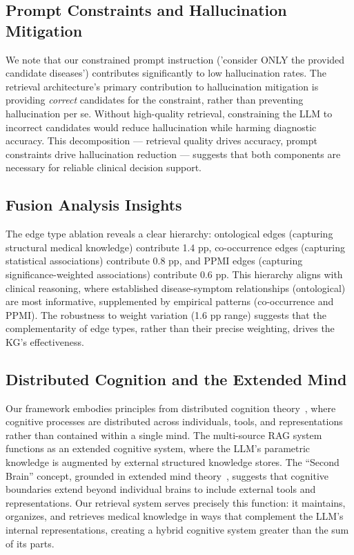 \documentclass[preprint,12pt]{elsarticle}
\begin{document}
\subsection{Prompt Constraints and Hallucination Mitigation}

We note that our constrained prompt instruction ('consider ONLY the provided candidate diseases') contributes significantly to low hallucination rates. The retrieval architecture's primary contribution to hallucination mitigation is providing \emph{correct} candidates for the constraint, rather than preventing hallucination per se. Without high-quality retrieval, constraining the LLM to incorrect candidates would reduce hallucination while harming diagnostic accuracy. This decomposition — retrieval quality drives accuracy, prompt constraints drive hallucination reduction — suggests that both components are necessary for reliable clinical decision support.

\subsection{Fusion Analysis Insights}

The edge type ablation reveals a clear hierarchy: ontological edges (capturing structural medical knowledge) contribute 1.4 pp, co-occurrence edges (capturing statistical associations) contribute 0.8 pp, and PPMI edges (capturing significance-weighted associations) contribute 0.6 pp. This hierarchy aligns with clinical reasoning, where established disease-symptom relationships (ontological) are most informative, supplemented by empirical patterns (co-occurrence and PPMI). The robustness to weight variation (1.6 pp range) suggests that the complementarity of edge types, rather than their precise weighting, drives the KG's effectiveness.

\subsection{Distributed Cognition and the Extended Mind}

Our framework embodies principles from distributed cognition theory~\cite{hutchins1995cognition}, where cognitive processes are distributed across individuals, tools, and representations rather than contained within a single mind. The multi-source RAG system functions as an extended cognitive system, where the LLM's parametric knowledge is augmented by external structured knowledge stores. The ``Second Brain'' concept, grounded in extended mind theory~\cite{clark1998extended}, suggests that cognitive boundaries extend beyond individual brains to include external tools and representations. Our retrieval system serves precisely this function: it maintains, organizes, and retrieves medical knowledge in ways that complement the LLM's internal representations, creating a hybrid cognitive system greater than the sum of its parts.
\end{document}
